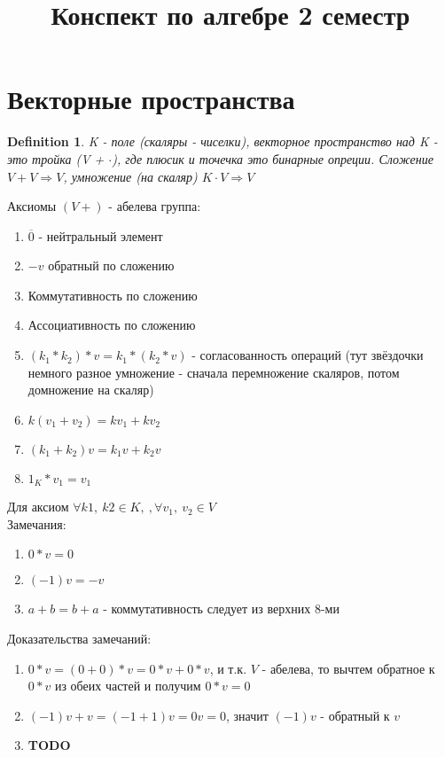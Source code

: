 \documentclass[12pt]{article}
\title{Конспект по алгебре 2 семестр}
\newtheorem{definition}{Definition}
\begin{document}
\maketitle
\section{Векторные пространства}
\begin{definition}
K - поле (скаляры - чиселки), векторное пространство над K - это тройка (V + $\cdot$), где плюсик и точечка это бинарные опреции. Сложение $V + V \Rightarrow V$, умножение (на скаляр) $K \cdot V \Rightarrow V$
\end{definition}

Аксиомы $(V +)$ - абелева группа: \begin{enumerate}
    \item $\overline{0}$ - нейтральный элемент 
    \item $-v$ обратный по сложению
    \item Коммутативность по сложению
    \item Ассоциативность по сложению
    \item $(k_1 * k_2) * v = k_1 * (k_2 * v)$ - согласованность операций (тут звёздочки немного разное умножение - сначала перемножение скаляров, потом домножение на скаляр)
    \item $k (v_1 + v_2) = kv_1 + k v_2$
    \item $(k_1 + k_2) v = k_1v + k_2v$
    \item $1_K * v_1 = v_1$
\end{enumerate} 
Для аксиом $\forall k1,\  k2 \in K, \ , \forall v_1, \ v_2 \in V$
\\

Замечания:
\begin{enumerate}
    \item  $0 * v = 0$
    \item $(-1) v = -v$ 
    \item $a + b = b + a$ - коммутативность следует из верхних 8-ми
\end{enumerate}
Доказательства замечаний: 
\begin{enumerate}
    \item $0 * v = (0 + 0) * v = 0 * v + 0 * v$, и т.к. $V$ - абелева, то вычтем обратное к $0 * v$ из обеих частей и получим $0 * v = 0$
    \item $(-1) v + v = (-1 + 1)v = 0 v = 0$, значит $(-1)v$ - обратный к $v$
    \item \textbf{TODO}
\end{enumerate}
\\
\end{document}
